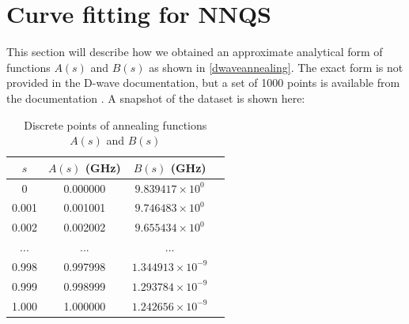 \chapter{Curve fitting for NNQS}\label{appendix:curvefitting}
This section will describe how we obtained an approximate analytical form of functions $A(s)$ and $B(s)$ as shown in \autoref{dwaveannealing}. The exact form is not provided in the D-wave documentation, but a set of 1000 points is available from the documentation \cite{dwavefunctions}. A snapshot of the dataset is shown here:
\begin{table}[!h]
    \centering
    \begin{tabular}{cccc}
    \hline
    $s$ & $A(s)$ (GHz) & $B(s)$ (GHz)\\
    \hline
    0 & 0.000000 & $9.839417 \times 10^0$ \\
    0.001 & 0.001001 & $9.746483 \times 10^0$ \\
    0.002 & 0.002002 & $9.655434 \times 10^0$ \\
    ... & ... & ... \\
    0.998 & 0.997998 & $1.344913 \times 10^{-9}$\\
    0.999 & 0.998999 & $1.293784 \times 10^{-9}$\\
    1.000 & 1.000000 & $1.242656 \times 10^{-9}$\\
    \hline
    \end{tabular}
    \caption{Discrete points of annealing functions $A(s)$ and $B(s)$}
    \label{tab:dwavefunction}
\end{table}

